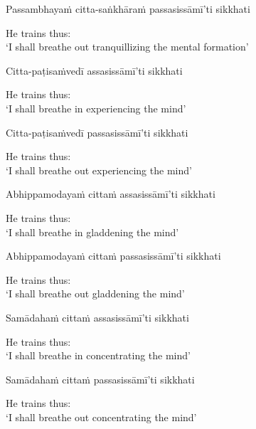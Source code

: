 \begin{pali-hang}
Passambhayaṁ citta-saṅkhāraṁ passasissāmī'ti sikkhati
\end{pali-hang}

\begin{english}
  He trains thus:\\
  `I shall breathe out tranquillizing the mental formation'
\end{english}

Citta-paṭisaṁvedī assasissāmī'ti sikkhati

\begin{english}
  He trains thus:\\
  `I shall breathe in experiencing the mind'
\end{english}

\ifninebythirteen\clearpage\fi

Citta-paṭisaṁvedī passasissāmī'ti sikkhati

\begin{english}
  He trains thus:\\
  `I shall breathe out experiencing the mind'
\end{english}

Abhippamodayaṁ cittaṁ assasissāmī'ti sikkhati

\begin{english}
  He trains thus:\\
  `I shall breathe in gladdening the mind'
\end{english}

Abhippamodayaṁ cittaṁ passasissāmī'ti sikkhati

\begin{english}
  He trains thus:\\
  `I shall breathe out gladdening the mind'
\end{english}

\ifbfive\clearpage\fi
\ifafive\clearpage\fi

Samādahaṁ cittaṁ assasissāmī'ti sikkhati

\begin{english}
  He trains thus:\\
  `I shall breathe in concentrating the mind'
\end{english}

Samādahaṁ cittaṁ passasissāmī'ti sikkhati

\begin{english}
  He trains thus:\\
  `I shall breathe out concentrating the mind'
\end{english}


